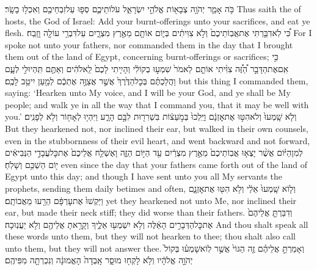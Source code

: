 \setcounter{chap}{7}
\setcounter{verse}{21}
{כֹּ֥ה אָמַ֛ר יְהֹוָ֥ה צְבָא֖וֹת אֱלֹהֵ֣י יִשְׂרָאֵ֑ל עֹלוֹתֵיכֶ֛ם סְפ֥וּ עַל\maqqaf זִבְחֵיכֶ֖ם וְאִכְל֥וּ בָשָֽׂר׃}
{Thus saith the \lord\space of hosts, the God of Israel: Add your burnt-offerings unto your sacrifices, and eat ye flesh.}
{כִּ֠י לֹֽא\maqqaf דִבַּ֤רְתִּי אֶת\maqqaf אֲבֽוֹתֵיכֶם֙ וְלֹ֣א צִוִּיתִ֔ים בְּי֛וֹם  אוֹתָ֖ם מֵאֶ֣רֶץ מִצְרָ֑יִם עַל\maqqaf דִּבְרֵ֥י עוֹלָ֖ה וָזָֽבַח׃}
{For I spoke not unto your fathers, nor commanded them in the day that I brought them out of the land of Egypt, concerning burnt-offerings or sacrifices;}
{כִּ֣י אִֽם\maqqaf אֶת\maqqaf הַדָּבָ֣ר הַ֠זֶּ֠ה צִוִּ֨יתִי אוֹתָ֤ם לֵאמֹר֙ שִׁמְע֣וּ בְקוֹלִ֔י וְהָיִ֤יתִי לָכֶם֙ לֵֽאלֹהִ֔ים וְאַתֶּ֖ם תִּֽהְיוּ\maqqaf לִ֣י לְעָ֑ם וַהֲלַכְתֶּ֗ם בְּכׇל\maqqaf הַדֶּ֙רֶךְ֙ אֲשֶׁ֣ר אֲצַוֶּ֣ה אֶתְכֶ֔ם לְמַ֖עַן יִיטַ֥ב לָכֶֽם׃}
{but this thing I commanded them, saying: ‘Hearken unto My voice, and I will be your God, and ye shall be My people; and walk ye in all the way that I command you, that it may be well with you.’}
{וְלֹ֤א שָֽׁמְעוּ֙ וְלֹא\maqqaf הִטּ֣וּ אֶת\maqqaf אׇזְנָ֔ם וַיֵּֽלְכוּ֙ בְּמֹ֣עֵצ֔וֹת בִּשְׁרִר֖וּת לִבָּ֣ם הָרָ֑ע וַיִּהְי֥וּ לְאָח֖וֹר וְלֹ֥א לְפָנִֽים׃}
{But they hearkened not, nor inclined their ear, but walked in their own counsels, even in the stubbornness of their evil heart, and went backward and not forward,}
{לְמִן\maqqaf הַיּ֗וֹם אֲשֶׁ֨ר יָצְא֤וּ אֲבֽוֹתֵיכֶם֙ מֵאֶ֣רֶץ מִצְרַ֔יִם עַ֖ד הַיּ֣וֹם הַזֶּ֑ה וָאֶשְׁלַ֤ח אֲלֵיכֶם֙ אֶת\maqqaf כׇּל\maqqaf עֲבָדַ֣י הַנְּבִיאִ֔ים י֖וֹם הַשְׁכֵּ֥ם וְשָׁלֹֽחַ׃}
{even since the day that your fathers came forth out of the land of Egypt unto this day; and though I have sent unto you all My servants the prophets, sending them daily betimes and often,}
{וְל֤וֹא שָֽׁמְעוּ֙ אֵלַ֔י וְלֹ֥א הִטּ֖וּ אֶת\maqqaf אׇזְנָ֑ם וַיַּקְשׁוּ֙ אֶת\maqqaf עׇרְפָּ֔ם הֵרֵ֖עוּ מֵאֲבוֹתָֽם׃}
{yet they hearkened not unto Me, nor inclined their ear, but made their neck stiff; they did worse than their fathers.}
{וְדִבַּרְתָּ֤ אֲלֵיהֶם֙ אֶת\maqqaf כׇּל\maqqaf הַדְּבָרִ֣ים הָאֵ֔לֶּה וְלֹ֥א יִשְׁמְע֖וּ אֵלֶ֑יךָ וְקָרָ֥אתָ אֲלֵיהֶ֖ם וְלֹ֥א יַעֲנֽוּכָה׃}
{And thou shalt speak all these words unto them, but they will not hearken to thee; thou shalt also call unto them, but they will not answer thee.}
{וְאָמַרְתָּ֣ אֲלֵיהֶ֗ם זֶ֤ה הַגּוֹי֙ אֲשֶׁ֣ר לֽוֹא\maqqaf שָׁמְע֗וּ בְּקוֹל֙ יְהֹוָ֣ה אֱלֹהָ֔יו וְלֹ֥א לָקְח֖וּ מוּסָ֑ר אָֽבְדָה֙ הָאֱמוּנָ֔ה וְנִכְרְתָ֖ה מִפִּיהֶֽם׃ \setuma }
